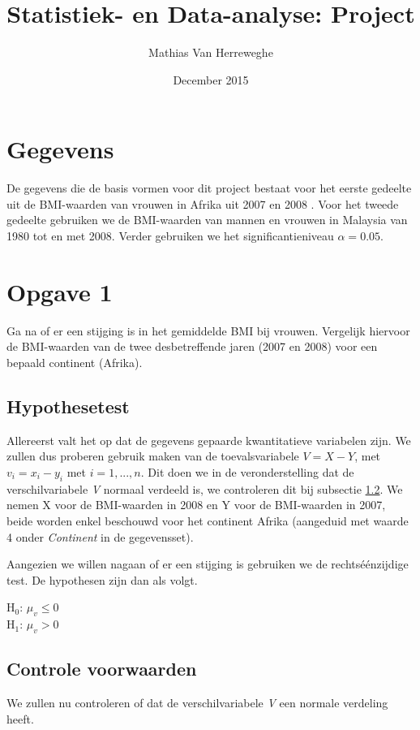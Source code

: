 \documentclass[11pt]{article}
\title{Statistiek- en Data-analyse: Project}
\author{Mathias Van Herreweghe}
\date{December 2015}
\begin{document}


\section*{Gegevens}
De gegevens die de basis vormen voor dit project bestaat voor het eerste gedeelte uit de BMI-waarden van vrouwen in Afrika uit 2007 en 2008 . Voor het tweede gedeelte gebruiken we de BMI-waarden van mannen en vrouwen in Malaysia van 1980 tot en met 2008. Verder gebruiken we het significantieniveau $ \alpha = 0.05 $.
\section{Opgave 1}
Ga na of er een stijging is in het gemiddelde BMI bij vrouwen. Vergelijk hiervoor de
BMI-waarden van de twee desbetreffende jaren (2007 en 2008) voor een bepaald continent (Afrika).

\subsection{Hypothesetest}
Allereerst valt het op dat de gegevens gepaarde kwantitatieve variabelen zijn. We zullen dus proberen gebruik maken van de toevalsvariabele $ V=X-Y$, met $v_{i}=x_{i}-y_{i}$ met $i=1,...,n$. Dit doen we in de veronderstelling dat de verschilvariabele {\it V} normaal verdeeld is, we controleren dit bij subsectie \ref{subsec:control1}. We nemen X voor de BMI-waarden in 2008 en Y voor de BMI-waarden in 2007, beide worden enkel beschouwd voor het continent Afrika (aangeduid met waarde 4 onder {\it Continent} in de gegevensset).

Aangezien we willen nagaan of er een stijging is gebruiken we de rechtséénzijdige test. De hypothesen zijn dan als volgt.
\begin{center}
H${_0}$: $ \mu_{v} \leqslant 0 $ \\
H${_1}$: $ \mu_{v} > 0 $
\end{center}
\newpage

\subsection{Controle voorwaarden}
\label{subsec:control1}
We zullen nu controleren of dat de verschilvariabele {\it V} een normale verdeling heeft.
\end{document}
